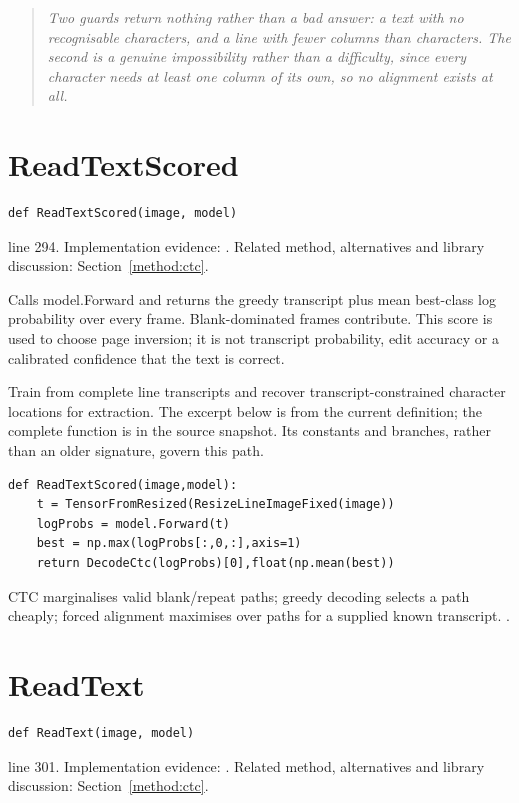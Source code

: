 \begin{quote}\small\itshape Two guards return nothing rather than a bad answer: a text with no recognisable characters, and a line with fewer columns than characters. The second is a genuine impossibility rather than a difficulty, since every character needs at least one column of its own, so no alignment exists at all.\end{quote}


\section{ReadTextScored}\label{fn:recognise:ReadTextScored}
\begin{lstlisting}[style=sig]
def ReadTextScored(image, model)
\end{lstlisting}
 line 294. Implementation evidence: \cite{code2026}. Related method, alternatives and library discussion: Section~\ref{method:ctc}.


Calls model.Forward and returns the greedy transcript plus mean best-class log probability over every frame. Blank-dominated frames contribute. This score is used to choose page inversion; it is not transcript probability, edit accuracy or a calibrated confidence that the text is correct.


Train from complete line transcripts and recover transcript-constrained character locations for extraction. The excerpt below is from the current definition; the complete function is in the source snapshot. Its constants and branches, rather than an older signature, govern this path.


\begin{lstlisting}[style=plain]
def ReadTextScored(image,model):
    t = TensorFromResized(ResizeLineImageFixed(image))
    logProbs = model.Forward(t)
    best = np.max(logProbs[:,0,:],axis=1)
    return DecodeCtc(logProbs)[0],float(np.mean(best))
\end{lstlisting}
CTC marginalises valid blank/repeat paths; greedy decoding selects a path cheaply; forced alignment maximises over paths for a supplied known transcript. \cite{graves2006,ctcdistill,torchctc}.


\section{ReadText}\label{fn:recognise:ReadText}
\begin{lstlisting}[style=sig]
def ReadText(image, model)
\end{lstlisting}
 line 301. Implementation evidence: \cite{code2026}. Related method, alternatives and library discussion: Section~\ref{method:ctc}.


